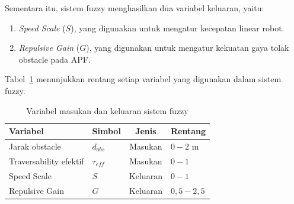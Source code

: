 Sementara itu, sistem fuzzy menghasilkan dua variabel keluaran, yaitu:

\begin{enumerate}
\item \textit{Speed Scale} ($S$), yang digunakan untuk mengatur kecepatan linear robot.
\item \textit{Repulsive Gain} ($G$), yang digunakan untuk mengatur kekuatan gaya tolak obstacle pada APF.
\end{enumerate}

Tabel~\ref{tab:fuzzy_var} menunjukkan rentang setiap variabel yang digunakan dalam sistem fuzzy.

\begin{table}[h]
    \centering
    \caption{Variabel masukan dan keluaran sistem fuzzy}
    \label{tab:fuzzy_var}
    \begin{tabular}{llcl}
        \hline
        Variabel & Simbol & Jenis & Rentang \\
        \hline
        Jarak obstacle      & $d_{obs}$     & Masukan & $0 - 2$ m \\
        Traversability efektif & $\tau_{eff}$ & Masukan & $0 - 1$ \\
        Speed Scale         & $S$           & Keluaran & $0 - 1$ \\
        Repulsive Gain      & $G$           & Keluaran & $0{,}5 - 2{,}5$ \\
        \hline
    \end{tabular}
\end{table}






